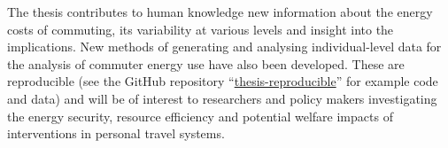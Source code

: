 \documentclass[a4paper, 11pt, twoside]{Thesis}  %
\begin{document}
{The thesis contributes to human knowledge new information about
the energy costs of commuting, its variability
at various levels and insight into the implications.
New methods of generating and analysing individual-level
data for the analysis of commuter energy use have also been developed.
These are reproducible (see the GitHub repository ``\href{https://github.com/Robinlovelace/thesis-reproducible}{thesis-reproducible}''
for example code and data) and will be of interest
to researchers and policy makers investigating
the energy security, resource efficiency and potential welfare impacts
of interventions in personal travel systems.
}

\clearpage  %

\end{document}
